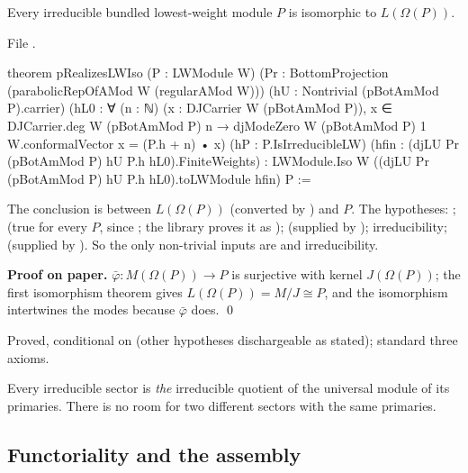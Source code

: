 \begin{theorem}\label{l13:thm:realizes}
Every irreducible bundled lowest-weight module $P$ is isomorphic to $L(\Omega(P))$.
\end{theorem}
\noindent File .
\begin{leancode}
theorem pRealizesLWIso (P : LWModule W)
    (Pr : BottomProjection (parabolicRepOfAMod W (regularAMod W)))
    (hU : Nontrivial (pBotAmMod P).carrier)
    (hL0 : ∀ (n : ℕ) (x : DJCarrier W (pBotAmMod P)), x ∈ DJCarrier.deg W (pBotAmMod P) n →
      djModeZero W (pBotAmMod P) 1 W.conformalVector x = (P.h + n) • x)
    (hP : P.IsIrreducibleLW)
    (hfin : (djLU Pr (pBotAmMod P) hU P.h hL0).FiniteWeights) :
    LWModule.Iso W ((djLU Pr (pBotAmMod P) hU P.h hL0).toLWModule hfin) P :=
\end{leancode}

\begin{dictionary}
The conclusion is  between $L(\Omega(P))$ (converted by ) and $P$. The hypotheses:
;  (true for every $P$, since ; the library proves it as
);  (supplied by );  irreducibility;  (supplied by
). So the only non-trivial inputs are  and irreducibility.
\end{dictionary}

\textbf{Proof on paper.} $\bar\varphi:M(\Omega(P))\to P$ is surjective with kernel $J(\Omega(P))$; the first isomorphism theorem gives
$L(\Omega(P)) = M/J\cong P$, and the isomorphism intertwines the modes because $\bar\varphi$ does. \qed

\begin{status}
Proved, conditional on  (other hypotheses dischargeable as stated); standard three axioms.
\end{status}

\begin{physics}
Every irreducible sector is \emph{the} irreducible quotient of the universal module of its primaries. There is no room for two
different sectors with the same primaries.
\end{physics}

\subsection{Functoriality and the assembly}

